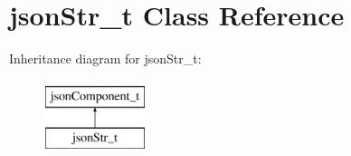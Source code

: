 \hypertarget{classjsonStr__t}{\section{json\-Str\-\_\-t \-Class \-Reference}
\label{classjsonStr__t}
}
\-Inheritance diagram for json\-Str\-\_\-t\-:\begin{figure}[H]
\begin{center}
\leavevmode
\includegraphics[height=2.000000cm]{classjsonStr__t}
\end{center}
\end{figure}
